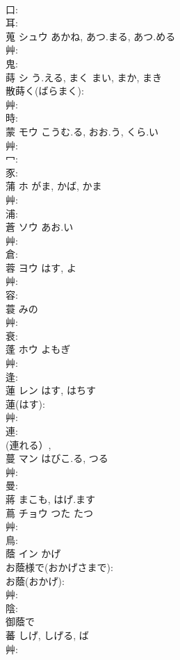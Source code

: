 \documentclass[8pt]{extreport}
\begin{document}
\begin{CJK}{UTF8}{min}
\\	口: 
\\	耳: 
\\	蒐	シュウ	あかね, あつ.まる, あつ.める		
\\	艸: 
\\	鬼: 
\\	蒔	シ	う.える, まく	まい, まか, まき	
\\	散蒔く(ばらまく): 
\\	艸: 
\\	時: 
\\	蒙	モウ	こうむ.る, おお.う, くら.い		
\\	艸: 
\\	冖: 
\\	豕: 
\\	蒲	ホ	がま, かば, かま		
\\	艸: 
\\	浦: 
\\	蒼	ソウ	あお.い		
\\	艸: 
\\	倉: 
\\	蓉	ヨウ		はす, よ	
\\	艸: 
\\	容: 
\\	蓑		みの				
\\	艸: 
\\	衰: 
\\	蓬	ホウ	よもぎ		
\\	艸: 
\\	逢: 
\\	蓮	レン	はす, はちす		
\\	蓮(はす): 
\\	艸: 
\\	連: 
\\	(連れる）, 
\\	蔓	マン	はびこ.る, つる		
\\	艸: 
\\	曼: 
\\	蔣		まこも, はげ.ます				
\\	蔦	チョウ	つた	たつ	
\\	艸: 
\\	鳥: 
\\	蔭	イン	かげ		
\\	お蔭様で(おかげさまで): 
\\	お蔭(おかげ): 
\\	艸: 
\\	陰: 
\\	御蔭で 
\\	蕃			しげ, しげる, ば			
\\	艸: 

\end{CJK}
\end{document}
